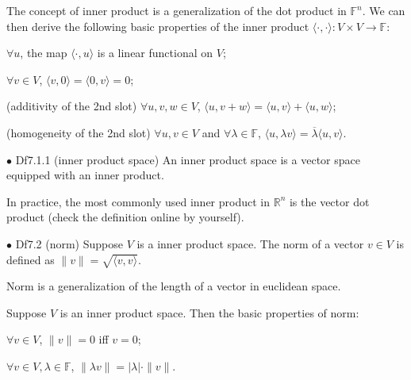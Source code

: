 \documentclass{article}
\begin{document}
\begin{Rmk}{}
    The concept of inner product is a generalization of the dot product in $\mathbb{F}^n$. We can then derive the following basic properties of the inner product $\langle \cdot, \cdot\rangle: V\times V\rightarrow \mathbb{F}$:
    \textcolor{Th}{
    \begin{compactenum}
        \item $\forall u$, the map $\langle \cdot, u\rangle$ is a linear functional on $V$;
        \item $\forall v\in V$, $\langle v, 0\rangle = \langle 0, v\rangle = 0$;
        \item (additivity of the 2nd slot) $\forall u, v, w\in V$, $\langle u, v+w\rangle = \langle u, v\rangle + \langle u, w\rangle$;
        \item (homogeneity of the 2nd slot) $\forall u, v\in V$ and $\forall \lambda\in \mathbb{F}$, $\langle u, \lambda v\rangle = \overline{\lambda}\langle u, v\rangle$.
    \end{compactenum}
    }
\end{Rmk}

\begin{Df}{$\bullet$ Df7.1.1 (inner product space)}
    An inner product space is a vector space equipped with an inner product.
\end{Df}

\begin{Rmk}{}
    In practice, the most commonly used inner product in $\mathbb{R}^n$ is the vector dot product (check the definition online by yourself).
\end{Rmk}

\begin{Df}{$\bullet$ Df7.2 (norm)}
    Suppose $V$ is a inner product space. The norm of a vector $v\in V$ is defined as $\|v\| = \sqrt{\langle v, v\rangle}$.
\end{Df}

\begin{Rmk}{}
    Norm is a generalization of the length of a vector in euclidean space. 
    \textcolor{Th}{Suppose $V$ is an inner product space. Then the basic properties of norm:
    \begin{compactenum}
        \item $\forall v\in V$, $\|v\|=0$ iff $v=0$;
        \item $\forall v\in V, \lambda\in\mathbb{F}$, $\|\lambda v\| = |\lambda|\cdot \|v\|$.
    \end{compactenum}}
\end{Rmk}
\end{document}

